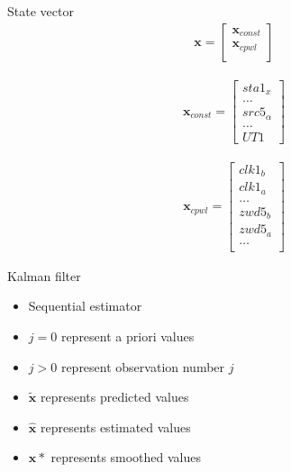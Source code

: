\documentclass[14pt,table,t, c]{beamer}
\begin{document}
\begin{frame}{State vector}
\begin{align*}
\mathbf{x} =
	\begin{bmatrix}
	\mathbf{x}_{const}     \\
	\mathbf{x}_{cpwl~}     \\
	\end{bmatrix}
\end{align*}
\begin{minipage}[c][][c]{0.48\linewidth}
\begin{align*}
\mathbf{x}_{const} =
	\begin{bmatrix}
	{{sta1_x}}     \\
	\ldots \\
	{{src5_\alpha}}     \\
	\ldots \\
	{UT1~}
	\end{bmatrix}
\end{align*}
\end{minipage}
\begin{minipage}[c][][c]{0.48\linewidth}
\begin{align*}
\mathbf{x}_{cpwl} =
	\begin{bmatrix}
	{{clk1_b}} \\
	{{clk1_a}} \\
	\ldots \\
	{{zwd5_b}} \\
	{{zwd5_a}} \\
	\ldots \\
	\end{bmatrix}
\end{align*}
\end{minipage}
\end{frame}

\begin{frame}{Kalman filter}
\begin{itemize}
  \item Sequential estimator
  \item $j=0$ represent a priori values
  \item $j>0$ represent observation number $j$
  \item $\tilde{\mathbf{x}}$ represents predicted values
  \item $\hat{\mathbf{x}}$ represents estimated values 
  \item $\mathbf{x}*$ represents smoothed values
\end{itemize}
\end{frame}
\end{document}
